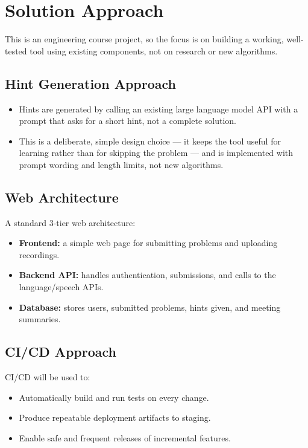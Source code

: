 \documentclass[11pt]{article}
\begin{document}
\section{Solution Approach}
This is an engineering course project, so the focus is on building a working, well-tested tool using existing components, not on research or new algorithms.

\subsection{Hint Generation Approach}
\begin{itemize}
    \item Hints are generated by calling an existing large language model API with a prompt that asks for a short hint, not a complete solution.
    \item This is a deliberate, simple design choice --- it keeps the tool useful for learning rather than for skipping the problem --- and is implemented with prompt wording and length limits, not new algorithms.
\end{itemize}

\subsection{Web Architecture}
A standard 3-tier web architecture:
\begin{itemize}
    \item \textbf{Frontend:} a simple web page for submitting problems and uploading recordings.
    \item \textbf{Backend API:} handles authentication, submissions, and calls to the language/speech APIs.
    \item \textbf{Database:} stores users, submitted problems, hints given, and meeting summaries.
\end{itemize}

\subsection{CI/CD Approach}
CI/CD will be used to:
\begin{itemize}
    \item Automatically build and run tests on every change.
    \item Produce repeatable deployment artifacts to staging.
    \item Enable safe and frequent releases of incremental features.
\end{itemize}
\end{document}
